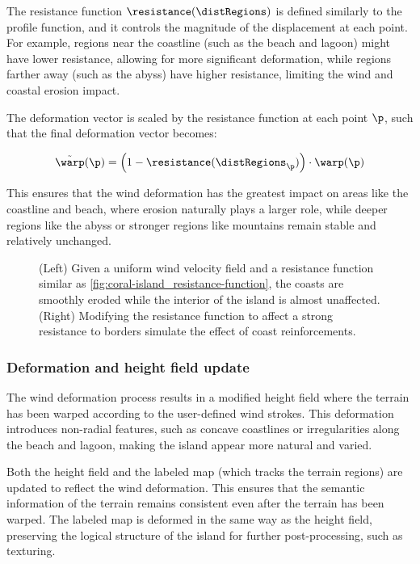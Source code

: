 The resistance function $\resistance(\distRegions)$ is defined similarly to the profile function, and it controls the magnitude of the displacement at each point. For example, regions near the coastline (such as the beach and lagoon) might have lower resistance, allowing for more significant deformation, while regions farther away (such as the abyss) have higher resistance, limiting the wind and coastal erosion impact.

The deformation vector is scaled by the resistance function at each point $\p$, such that the final deformation vector becomes:

\begin{align}
    \Tilde{\warp}(\p) = \left(1 - \resistance(\distRegions_\p) \right) \cdot \warp(\p)
\end{align}

This ensures that the wind deformation has the greatest impact on areas like the coastline and beach, where erosion naturally plays a larger role, while deeper regions like the abyss or stronger regions like mountains remain stable and relatively unchanged.

\begin{figure}[H]
    \caption{(Left) Given a uniform wind velocity field and a resistance function similar as \cref{fig:coral-island_resistance-function}, the coasts are smoothly eroded while the interior of the island is almost unaffected. (Right) Modifying the resistance function to affect a strong resistance to borders simulate the effect of coast reinforcements.}
\end{figure}

\subsubsection{Deformation and height field update}

The wind deformation process results in a modified height field where the terrain has been warped according to the user-defined wind strokes. This deformation introduces non-radial features, such as concave coastlines or irregularities along the beach and lagoon, making the island appear more natural and varied.

Both the height field and the labeled map (which tracks the terrain regions) are updated to reflect the wind deformation. This ensures that the semantic information of the terrain remains consistent even after the terrain has been warped. The labeled map is deformed in the same way as the height field, preserving the logical structure of the island for further post-processing, such as texturing.

